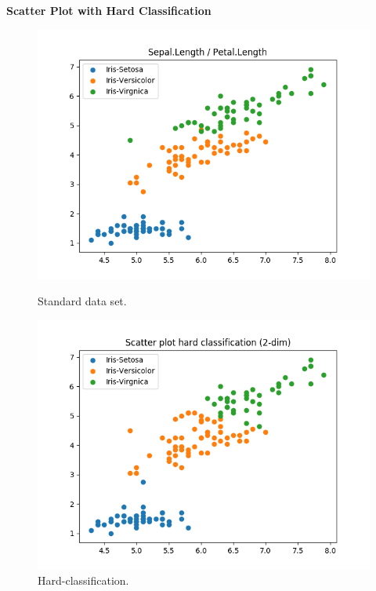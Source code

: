 \documentclass[a4paper]{article}
\begin{document}
\begin{enumerate}
\newpage

{\large \textbf{Scatter Plot with Hard Classification}} \\


\begin{figure}[htp]
\begin{minipage}{0.4\textwidth}
	\centering
  \includegraphics[scale=0.6]{plots/basic_scenario1_cmpnt3.png}
  \caption{Standard data set.}
\end{minipage}
\hfill
\begin{minipage}{0.4\textwidth}
	\centering
  \includegraphics[scale=0.6]{plots/hard_scatter_scenario1_cmpnt3.png}
  \caption{Hard-classification.}
\end{minipage}
\end{figure}


\end{enumerate}
\end{document}

